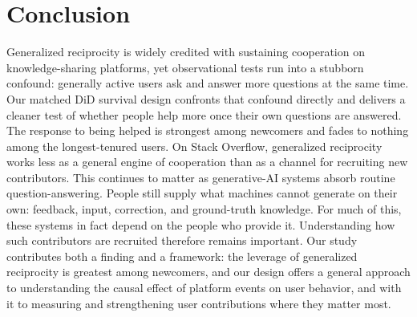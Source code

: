 \section{Conclusion} \label{sec:conclusion} %
Generalized reciprocity is widely credited with sustaining cooperation on knowledge-sharing platforms, yet observational tests run into a stubborn confound: generally active users ask and answer more questions at the same time. Our matched DiD survival design confronts that confound directly and delivers a cleaner test of whether people help more once their own questions are answered. The response to being helped is strongest among newcomers and fades to nothing among the longest-tenured users. On Stack Overflow, generalized reciprocity works less as a general engine of cooperation than as a channel for recruiting new contributors. This continues to matter as generative-AI systems absorb routine question-answering. People still supply what machines cannot generate on their own: feedback, input, correction, and ground-truth knowledge. For much of this, these systems in fact depend on the people who provide it. Understanding how such contributors are recruited therefore remains important. Our study contributes both a finding and a framework: the leverage of generalized reciprocity is greatest among newcomers, and our design offers a general approach to understanding the causal effect of platform events on user behavior, and with it to measuring and strengthening user contributions where they matter most.
